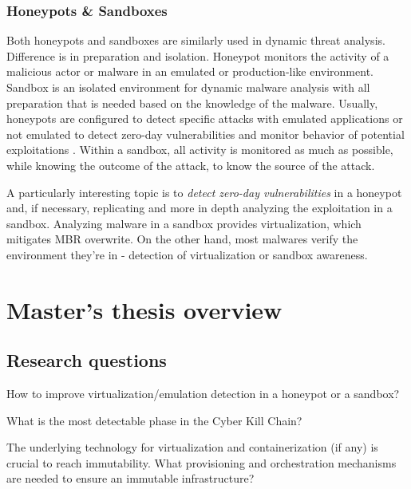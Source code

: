 \documentclass[12pt,a4paper,twoside]{report}
\begin{document}
\subsection{Honeypots \& Sandboxes}\label{honeypots-sandboxes}

Both honeypots and sandboxes are similarly used in dynamic threat analysis. Difference is in preparation and isolation. Honeypot monitors the activity of a malicious actor or malware in an emulated or production-like environment. Sandbox is an isolated environment for dynamic malware analysis with all preparation that is needed based on the knowledge of the malware. Usually, honeypots are configured to detect specific attacks with emulated applications or not emulated to detect zero-day vulnerabilities and monitor behavior of potential exploitations \cite{research:enisa:honeypots}. Within a sandbox, all activity is monitored as much as possible, while knowing the outcome of the attack, to know the source of the attack.


A particularly interesting topic is to \emph{detect zero-day vulnerabilities} in a honeypot and, if necessary, replicating and more in depth analyzing the exploitation in a sandbox. Analyzing malware in a sandbox provides virtualization, which mitigates MBR overwrite. On the other hand, most malwares verify the environment they're in - detection of virtualization or sandbox awareness.

\chapter{Master's thesis overview}\label{masters-thesis-overview}

\section{Research questions}\label{research-questions}

How to improve virtualization/emulation detection in a honeypot or a
sandbox?

What is the most detectable phase in the Cyber Kill Chain?

The underlying technology for virtualization and containerization (if any) is crucial to reach immutability. What provisioning and orchestration mechanisms are needed to ensure an immutable infrastructure?
\end{document}
